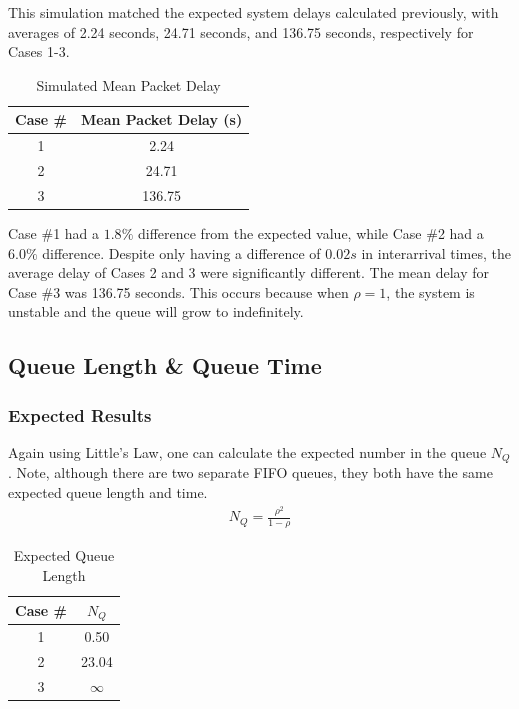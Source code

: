 \documentclass{article}
\begin{document}
This simulation matched the expected system delays calculated previously, with averages of 2.24 seconds, 24.71 seconds, and 136.75 seconds, respectively for Cases 1-3.

\begin{table}[h!]
\centering
\begin{tabular}{|c|c|} \hline
\textbf{Case \#} & \textbf{Mean Packet Delay (s)} \\ \hline
1 & 2.24  \\ \hline
2 & 24.71 \\ \hline
3 & 136.75  \\ \hline 
\end{tabular}
\caption{Simulated Mean Packet Delay}
\label{tab:meanPacketDelay}
\end{table}


Case \#1 had a $1.8\%$ difference from the expected value, while Case \#2 had a $6.0\%$ difference.
Despite only having a difference of $0.02s$ in interarrival times, the average delay of Cases 2 and 3 were significantly different. 
The mean delay for Case \#3 was 136.75 seconds.  
This occurs because when $\rho = 1$, the system is unstable and the queue will grow to indefinitely.

\newpage
\subsection*{Queue Length \& Queue Time}

\subsubsection*{Expected Results}
Again using Little's Law, one can calculate the expected number in the queue $N_Q$.
Note, although there are two separate FIFO queues, they both have the same expected queue length and time.
\begin{align*}
N_Q = \frac{\rho^2}{1-\rho}
\end{align*}

\begin{table}[h!]
\centering
\begin{tabular}{|c|c|} \hline
\textbf{Case \#} & $N_Q$ \\ \hline
1 & 0.50  \\ \hline
2 & 23.04 \\ \hline
3 & $\infty$  \\ \hline 
\end{tabular}
\caption{Expected Queue Length}
\label{tab:expectQlen}
\end{table}
\end{document}
